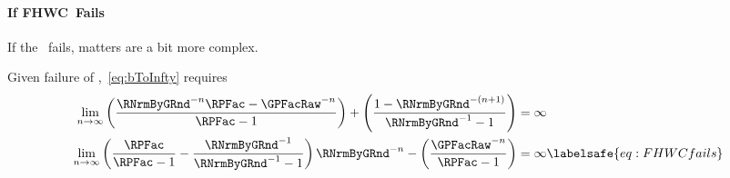 \documentclass[\econtexRoot/BufferStockTheory]{subfiles}
\begin{document}

\paragraph{If {FHWC}~Fails}
If the \FHWC~fails, matters are a bit more complex.

\begin{comment}
  As noted in the main text, the Finite Value Requirement for such a consumer
  requires $\GPFacRaw < (\Rfree/\PermGroFac)^{1/\CRRA}$,\footnote{A
    unique well-defined nondegenerate limiting consumption function can
    actually exist even if a nondegenerate value function does not.
But
    the parametric combinations required for this are somewhat peculiar
    (including both $\Rfree < 1$ and $\PermGroFac < 1$); but we restrict our attention
    to the more useful and plausible cases with finite value.} which is stronger (holds
  in strictly fewer circumstances) than the \GICRaw~condition $\GPFacRaw < 1$.
  Thus, the \GICRaw~is an implication of $\cncl{\FHWC}$.
\end{comment}

Given failure of \FHWC,~\eqref{eq:bToInfty} requires
\begin{equation}\begin{gathered}\begin{aligned}
  \lim_{n \rightarrow \infty} \left(\frac{\RNrmByGRnd^{-n}\RPFac-\GPFacRaw^{-n}}{\RPFac-1}\right) + \left(\frac{1-\RNrmByGRnd^{-(n+1)}}{\RNrmByGRnd^{-1}-1}\right)  & = \infty \notag
  \\   \lim_{n \rightarrow \infty} \left(\frac{\RPFac}{\RPFac-1}-\frac{\RNrmByGRnd^{-1}}{\RNrmByGRnd^{-1}-1}\right)\RNrmByGRnd^{-n}-\left(\frac{\GPFacRaw^{-n}}{\RPFac-1}\right)  & = \infty \labelsafe{eq:FHWCfails} 
\end{aligned}\end{gathered}\end{equation}
\hypertarget{PFGICHoldsFHWCFailsRICFailsDiscuss}{}
\end{document}
